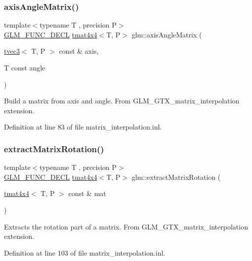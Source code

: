 \subsubsection{\texorpdfstring{axisAngleMatrix()}{axisAngleMatrix()}}
{\footnotesize\ttfamily template$<$typename T , precision P$>$ \\
\mbox{\hyperlink{setup_8hpp_ab2d052de21a70539923e9bcbf6e83a51}{G\+L\+M\+\_\+\+F\+U\+N\+C\+\_\+\+D\+E\+CL}} \mbox{\hyperlink{structglm_1_1tmat4x4}{tmat4x4}}$<$T, P$>$ glm\+::axis\+Angle\+Matrix (\begin{DoxyParamCaption}\item[{\mbox{\hyperlink{structglm_1_1tvec3}{tvec3}}$<$ T, P $>$ const \&}]{axis,  }\item[{T const}]{angle }\end{DoxyParamCaption})}

Build a matrix from axis and angle. From G\+L\+M\+\_\+\+G\+T\+X\+\_\+matrix\+\_\+interpolation extension. 

Definition at line 83 of file matrix\+\_\+interpolation.\+inl.

\mbox{\label{group__gtx__matrix__interpolation_ga6b8170aa4cf43caf81400696ebb38afe}} 
\subsubsection{\texorpdfstring{extractMatrixRotation()}{extractMatrixRotation()}}
{\footnotesize\ttfamily template$<$typename T , precision P$>$ \\
\mbox{\hyperlink{setup_8hpp_ab2d052de21a70539923e9bcbf6e83a51}{G\+L\+M\+\_\+\+F\+U\+N\+C\+\_\+\+D\+E\+CL}} \mbox{\hyperlink{structglm_1_1tmat4x4}{tmat4x4}}$<$T, P$>$ glm\+::extract\+Matrix\+Rotation (\begin{DoxyParamCaption}\item[{\mbox{\hyperlink{structglm_1_1tmat4x4}{tmat4x4}}$<$ T, P $>$ const \&}]{mat }\end{DoxyParamCaption})}

Extracts the rotation part of a matrix. From G\+L\+M\+\_\+\+G\+T\+X\+\_\+matrix\+\_\+interpolation extension. 

Definition at line 103 of file matrix\+\_\+interpolation.\+inl.

